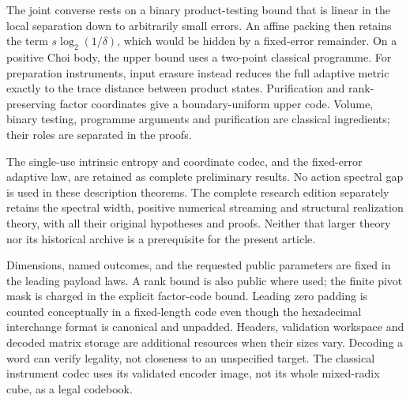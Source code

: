 The joint converse rests on a binary product-testing bound that is
linear in the local separation down to arbitrarily small errors.
An affine packing then retains the term $s\log_2(1/\delta)$, which
would be hidden by a fixed-error remainder. On a positive Choi body,
the upper bound uses a two-point classical programme. For preparation
instruments, input erasure instead reduces the full adaptive metric
exactly to the trace distance between product states. Purification
and rank-preserving factor coordinates give a boundary-uniform upper
code. Volume, binary testing, programme arguments and purification
are classical ingredients; their roles are separated in the proofs.

The single-use intrinsic entropy and coordinate codec, and the
fixed-error adaptive law, are retained as complete preliminary
results. No action spectral gap is used in these description theorems.
The complete research edition separately retains the spectral width,
positive numerical streaming and structural realization theory, with
all their original hypotheses and proofs. Neither that larger theory
nor its historical archive is a prerequisite for the present article.

Dimensions, named outcomes, and the requested public parameters are
fixed in the leading payload laws. A rank bound is also public where
used; the finite pivot mask is charged in the explicit factor-code
bound. Leading zero padding is counted conceptually in a fixed-length
code even though the hexadecimal interchange format is canonical and
unpadded. Headers, validation workspace and decoded matrix storage
are additional resources when their sizes vary. Decoding a word can
verify legality, not closeness to an unspecified target. The classical
instrument codec uses its validated encoder image, not its whole
mixed-radix cube, as a legal codebook.
